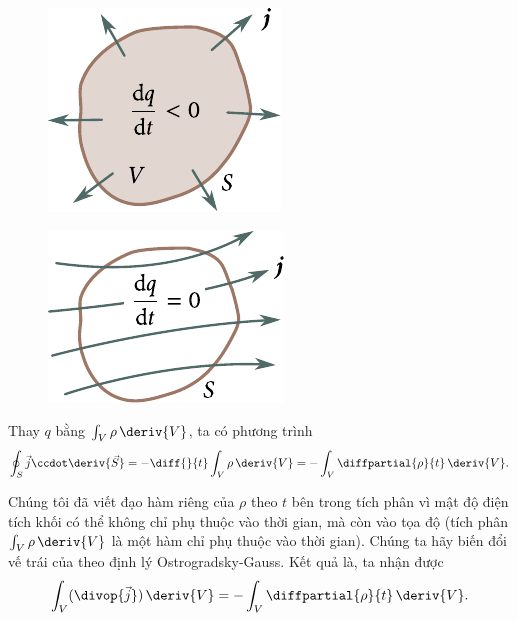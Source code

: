 \begin{figure}[!htb]
	\begin{minipage}[t]{0.48\linewidth}
		\begin{center}
			\includegraphics[scale=1]{figures/ch_05/fig_5_1.pdf}
			\caption[]{}
			\label{fig:5_1}
		\end{center}
	\end{minipage}
	\hfill{ }%
	\begin{minipage}[t]{0.48\linewidth}
		\begin{center}
			\includegraphics[scale=1]{figures/ch_05/fig_5_2.pdf}
			\caption[]{}
			\label{fig:5_2}
		\end{center}
	\end{minipage}
\vspace{-0.4cm}
\end{figure}

Thay $q$ bằng $\int_V \rho\,\deriv{V}$, ta có phương trình
\begin{equation}\label{eq:5_9}
    \oint_S \vec{j} \ccdot \deriv{\vec{S}} = - \diff{}{t} \int_V \rho\, \deriv{V} = - \int_V \diffpartial{\rho}{t}\, \deriv{V}.
\end{equation}

\noindent
Chúng tôi đã viết đạo hàm riêng của $\rho$ theo $t$ bên trong tích phân vì mật độ điện tích khối có thể
không chỉ phụ thuộc vào thời gian, mà còn vào  
tọa độ (tích phân $\int_V \rho\,\deriv{V}$ là một hàm chỉ phụ thuộc vào thời gian). Chúng ta hãy biến đổi vế trái của  theo định lý Ostrogradsky-Gauss. Kết quả là, ta nhận được
\begin{equation}\label{eq:5_10}
    \int_V (\divop{\vec{j}})\, \deriv{V} = - \int_V \diffpartial{\rho}{t}\, \deriv{V}.
\end{equation}


